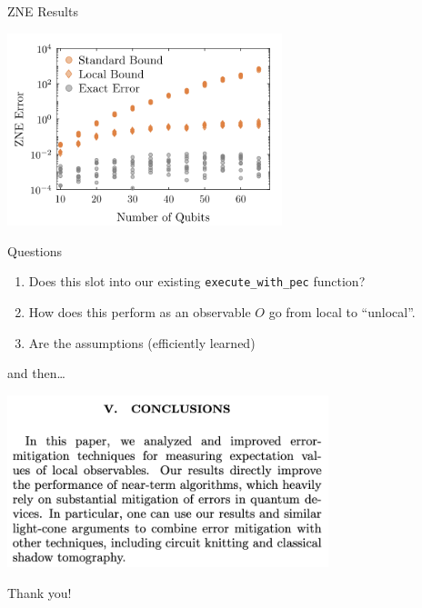 \documentclass[11pt,aspectratio=1610,xcolor=dvipsnames]{beamer}
\begin{document}
\begin{frame}{ZNE Results}
	\begin{center}
		\includegraphics[width=0.6\textwidth]{zne-bounds}
	\end{center}
\end{frame}

\begin{frame}[fragile]{Questions}
	\begin{enumerate}
		\item Does this slot into our existing \verb|execute_with_pec| function?
		\item How does this perform as an observable $O$ go from local to ``unlocal''.
		\item Are the assumptions (efficiently learned)
	\end{enumerate}
\end{frame}

\begin{frame}{and then\dots}
	\begin{center}
		\includegraphics[width=0.7\textwidth]{lookahead}
	\end{center}
\end{frame}

\begin{frame}[standout]
	Thank you!
\end{frame}
\end{document}
